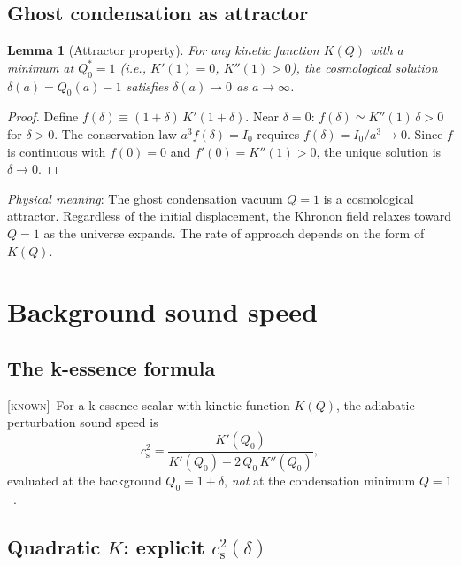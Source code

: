 \documentclass[prd,twocolumn,superscriptaddress,longbibliography,floatfix]{revtex4-2}
\newtheorem{lemma}[theorem]{Lemma}
\newcommand{\cs}{c_{\mathrm{s}}}
\newcommand{\known}{\textsc{[known]}}
\begin{document}
\subsection{Ghost condensation as attractor}
\label{sec:attractor}

\begin{lemma}[Attractor property]
\label{lem:attractor}
For any kinetic function $K(Q)$ with a minimum at $Q_0^* = 1$
(i.e., $K'(1) = 0$, $K''(1) > 0$), the cosmological
solution $\delta(a) = Q_0(a) - 1$ satisfies
$\delta(a) \to 0$ as $a \to \infty$.
\end{lemma}

\begin{proof}
Define $f(\delta) \equiv (1{+}\delta)\,K'(1{+}\delta)$.
Near $\delta = 0$: $f(\delta) \simeq K''(1)\,\delta > 0$
for $\delta > 0$.  The conservation law $a^3 f(\delta) = I_0$
requires $f(\delta) = I_0/a^3 \to 0$.  Since $f$ is
continuous with $f(0) = 0$ and $f'(0) = K''(1) > 0$,
the unique solution is $\delta \to 0$.
\end{proof}

\emph{Physical meaning}: The ghost condensation vacuum
$Q = 1$ is a cosmological attractor.  Regardless of the
initial displacement, the Khronon field relaxes toward
$Q = 1$ as the universe expands.  The rate of approach
depends on the form of $K(Q)$.


\section{Background sound speed}
\label{sec:cs2}

\subsection{The k-essence formula}
\label{sec:kessence}

\known\ For a k-essence scalar with kinetic function
$K(Q)$, the adiabatic perturbation sound speed is
\begin{equation}
\cs^2 = \frac{K'(Q_0)}{K'(Q_0) + 2\,Q_0\,K''(Q_0)},
\label{eq:cs2_kessence}
\end{equation}
evaluated at the background $Q_0 = 1 + \delta$, \emph{not}
at the condensation minimum $Q = 1$~\cite{Garriga1999,BPS2010}.

\subsection{Quadratic $K$: explicit $\cs^2(\delta)$}
\label{sec:cs2_quad}
\end{document}
